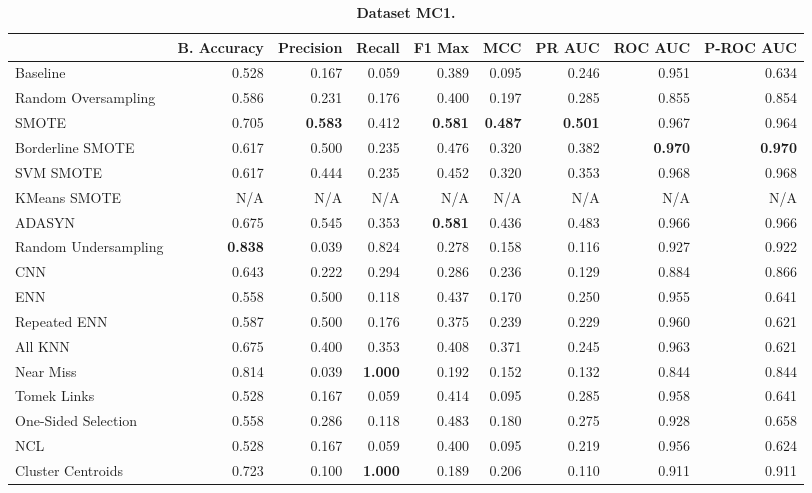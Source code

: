 \begin{table}[H]
    \centering
    \setlength\tabcolsep{2pt}
    \begin{tabularx}{\textwidth}{lRRRRRRRR}
        & B. Accuracy & Precision & Recall & F1 Max & MCC & PR AUC & ROC AUC & P-ROC AUC \\
        \midrule
        Baseline & 0.528 & 0.167 & 0.059 & 0.389 & 0.095 & 0.246 & 0.951 & 0.634 \\
        Random Oversampling & 0.586 & 0.231 & 0.176 & 0.400 & 0.197 & 0.285 & 0.855 & 0.854 \\
        SMOTE & 0.705 & \textbf{0.583} & 0.412 & \textbf{0.581} & \textbf{0.487} & \textbf{0.501} & 0.967 & 0.964 \\
        Borderline SMOTE & 0.617 & 0.500 & 0.235 & 0.476 & 0.320 & 0.382 & \textbf{0.970} & \textbf{0.970} \\
        SVM SMOTE & 0.617 & 0.444 & 0.235 & 0.452 & 0.320 & 0.353 & 0.968 & 0.968 \\
        KMeans SMOTE & N/A & N/A & N/A & N/A & N/A & N/A & N/A & N/A \\
        ADASYN & 0.675 & 0.545 & 0.353 & \textbf{0.581} & 0.436 & 0.483 & 0.966 & 0.966 \\
        Random Undersampling & \textbf{0.838} & 0.039 & 0.824 & 0.278 & 0.158 & 0.116 & 0.927 & 0.922 \\
        CNN & 0.643 & 0.222 & 0.294 & 0.286 & 0.236 & 0.129 & 0.884 & 0.866 \\
        ENN & 0.558 & 0.500 & 0.118 & 0.437 & 0.170 & 0.250 & 0.955 & 0.641 \\
        Repeated ENN & 0.587 & 0.500 & 0.176 & 0.375 & 0.239 & 0.229 & 0.960 & 0.621 \\
        All KNN & 0.675 & 0.400 & 0.353 & 0.408 & 0.371 & 0.245 & 0.963 & 0.621 \\
        Near Miss & 0.814 & 0.039 & \textbf{1.000} & 0.192 & 0.152 & 0.132 & 0.844 & 0.844 \\
        Tomek Links & 0.528 & 0.167 & 0.059 & 0.414 & 0.095 & 0.285 & 0.958 & 0.641 \\
        One-Sided Selection & 0.558 & 0.286 & 0.118 & 0.483 & 0.180 & 0.275 & 0.928 & 0.658 \\
        NCL & 0.528 & 0.167 & 0.059 & 0.400 & 0.095 & 0.219 & 0.956 & 0.624 \\
        Cluster Centroids & 0.723 & 0.100 & \textbf{1.000} & 0.189 & 0.206 & 0.110 & 0.911 & 0.911 \\
    \end{tabularx}
    \vspace{1mm}
    \caption{\textbf{Dataset MC1.}}
\end{table}
